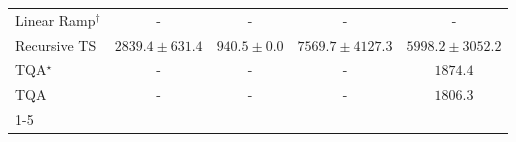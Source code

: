 \begin{tabular}{l|cccc|}
Linear Ramp$^\dagger$ & {\cellcolor[HTML]{000000}} \color[HTML]{F1F1F1} {\cellcolor{white}} \color{black} - & {\cellcolor[HTML]{000000}} \color[HTML]{F1F1F1} {\cellcolor{white}} \color{black} - & {\cellcolor[HTML]{000000}} \color[HTML]{F1F1F1} {\cellcolor{white}} \color{black} - & {\cellcolor[HTML]{000000}} \color[HTML]{F1F1F1} {\cellcolor{white}} \color{black} - \\
Recursive TS & {\cellcolor[HTML]{C4CBE3}} \color[HTML]{000000} $2839.4\pm 631.4$ & {\cellcolor[HTML]{FFF7FB}} \color[HTML]{000000} $940.5\pm 0.0$ & {\cellcolor[HTML]{023858}} \color[HTML]{F1F1F1} $7569.7\pm 4127.3$ & {\cellcolor[HTML]{056DAC}} \color[HTML]{F1F1F1} $5998.2\pm 3052.2$ \\
TQA$^\star$ & {\cellcolor[HTML]{000000}} \color[HTML]{F1F1F1} {\cellcolor{white}} \color{black} - & {\cellcolor[HTML]{000000}} \color[HTML]{F1F1F1} {\cellcolor{white}} \color{black} - & {\cellcolor[HTML]{000000}} \color[HTML]{F1F1F1} {\cellcolor{white}} \color{black} - & {\cellcolor[HTML]{E8E4F0}} \color[HTML]{000000} $1874.4$ \\
TQA & {\cellcolor[HTML]{000000}} \color[HTML]{F1F1F1} {\cellcolor{white}} \color{black} - & {\cellcolor[HTML]{000000}} \color[HTML]{F1F1F1} {\cellcolor{white}} \color{black} - & {\cellcolor[HTML]{000000}} \color[HTML]{F1F1F1} {\cellcolor{white}} \color{black} - & {\cellcolor[HTML]{EBE6F2}} \color[HTML]{000000} $1806.3$ \\
\cline{1-5}
\bottomrule
\end{tabular}
